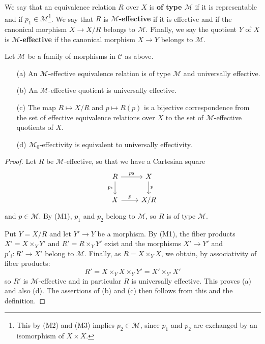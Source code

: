 \begin{definition}
We say that an equivalence relation $R$ over $X$ is \textbf{of type $\mathcal{M}$} if it is representable and if $p_1\in\mathcal{M}$\footnote{This by (M2) and (M3) implies $p_2\in\mathcal{M}$, since $p_1$ and $p_2$ are exchanged by an isomorphism of $X\times X$.}. We say that $R$ is \textbf{$\mathcal{M}$-effective} if it is effective and if the canonical morphism $X\to X/R$ belongs to $\mathcal{M}$. Finally, we say the quotient $Y$ of $X$ is \textbf{$\mathcal{M}$-effective} if the canonical morphism $X\to Y$ belongs to $\mathcal{M}$.
\end{definition}

\begin{proposition}\label{category equivalence relation M-effective prop}
Let $\mathcal{M}$ be a family of morphisms in $\mathcal{C}$ as above.
\begin{enumerate}
    \item[(a)] An $\mathcal{M}$-effective equivalence relation is of type $\mathcal{M}$ and universally effective. 
    \item[(b)] An $\mathcal{M}$-effective quotient is universally effective.
    \item[(c)] The map $R\mapsto X/R$ and $p\mapsto R(p)$ is a bijective correspondence from the set of effective equivalence relations over $X$ to the set of $\mathcal{M}$-effective quotients of $X$.
    \item[(d)] $\mathcal{M}_0$-effectivity is equivalent to universally effectivity.
\end{enumerate}
\end{proposition}
\begin{proof}
Let $R$ be $\mathcal{M}$-effective, so that we have a Cartesian square
\[\begin{tikzcd}
R\ar[r,"p_2"]\ar[d,swap,"p_1"]&X\ar[d,"p"]\\
X\ar[r,"p"]&X/R
\end{tikzcd}\]
and $p\in\mathcal{M}$. By (M1), $p_1$ and $p_2$ belong to $\mathcal{M}$, so $R$ is of type $\mathcal{M}$.\par
Put $Y=X/R$ and let $Y'\to Y$ be a morphism. By (M1), the fiber products $X'=X\times_YY'$ and $R'=R\times_YY'$ exist and the morphisms $X'\to Y'$ and $p'_i:R'\to X'$ belong to $\mathcal{M}$. Finally, as $R=X\times_YX$, we obtain, by associativity of fiber products:
\[R'=X\times_YX\times_YY'=X'\times_{Y'}X'\]
so $R'$ is $\mathcal{M}$-effective and in particular $R$ is universally effective. This proves (a) and also (d). The assertions of (b) and (c) then follows from this and the definition.
\end{proof}

